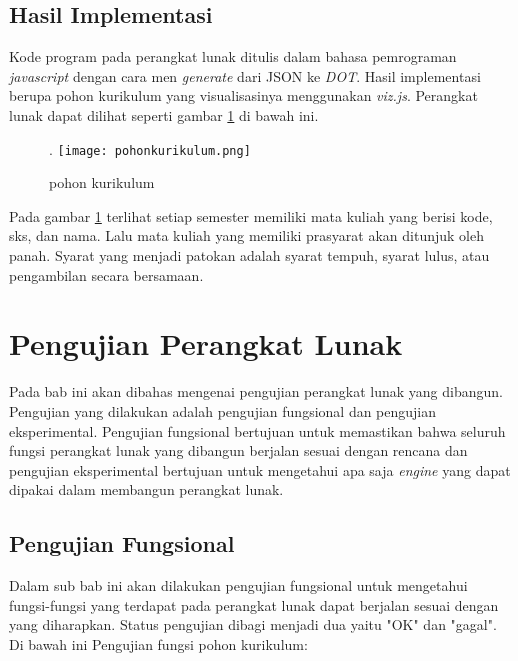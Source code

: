 \subsection{Hasil Implementasi}
\label{sec: Hasil Implementasi}

Kode program pada perangkat lunak ditulis dalam bahasa pemrograman \textit{javascript} dengan cara men \textit{generate} dari JSON ke \textit{DOT}. Hasil implementasi berupa pohon kurikulum yang visualisasinya menggunakan \textit{viz.js}. Perangkat lunak dapat dilihat seperti gambar \ref{fig: pohon kurikulum} di bawah ini.

\begin{figure}[H]
		\left.
		\texttt{[image: pohonkurikulum.png]}
		\caption{pohon kurikulum}
		\label{fig: pohon kurikulum}
\end{figure}	 

Pada gambar \ref{fig: pohon kurikulum} terlihat setiap semester memiliki mata kuliah yang berisi kode, sks, dan nama. Lalu mata kuliah yang memiliki prasyarat akan ditunjuk oleh panah. Syarat yang menjadi patokan adalah syarat tempuh, syarat lulus, atau pengambilan secara bersamaan.
\section{Pengujian Perangkat Lunak}
\label{sec: Pengujian Perangkat Lunak}

Pada bab ini akan dibahas mengenai pengujian perangkat lunak yang dibangun. Pengujian yang dilakukan adalah pengujian fungsional dan pengujian eksperimental. Pengujian fungsional bertujuan untuk memastikan bahwa seluruh fungsi perangkat lunak yang dibangun berjalan sesuai dengan rencana dan pengujian eksperimental bertujuan untuk mengetahui apa saja \textit{engine} yang dapat dipakai dalam membangun perangkat lunak.

\subsection{Pengujian Fungsional}
\label{sec: Pengujian Fungsional}
Dalam sub bab ini akan dilakukan pengujian fungsional untuk mengetahui fungsi-fungsi yang terdapat
pada perangkat lunak dapat berjalan sesuai dengan yang diharapkan. Status pengujian dibagi
menjadi dua yaitu "OK" dan "gagal". Di bawah ini Pengujian fungsi pohon kurikulum:

